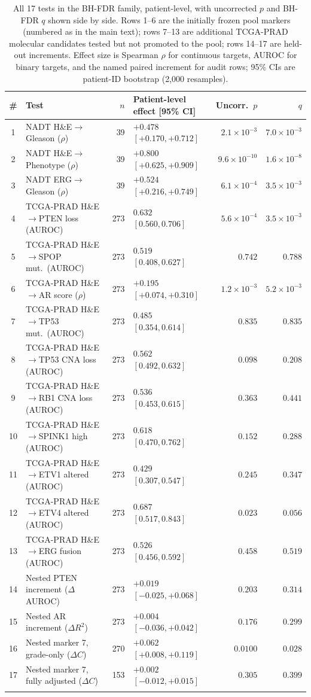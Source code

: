 \begingroup
\footnotesize
\begin{longtable}{@{}clrp{3.6cm}rr@{}}
\toprule
\# & Test & $n$ & Patient-level effect [95\% CI] & Uncorr.\ $p$ & $q$ \\
\midrule
\endhead
1 & NADT H\&E$\to$Gleason ($\rho$) & 39 & $+0.478$ $[+0.170,+0.712]$ & $2.1\times10^{-3}$ & $7.0\times10^{-3}$ \\
2 & NADT H\&E$\to$Phenotype ($\rho$) & 39 & $+0.800$ $[+0.625,+0.909]$ & $9.6\times10^{-10}$ & $1.6\times10^{-8}$ \\
3 & NADT ERG$\to$Gleason ($\rho$) & 39 & $+0.524$ $[+0.216,+0.749]$ & $6.1\times10^{-4}$ & $3.5\times10^{-3}$ \\
4 & TCGA-PRAD H\&E$\to$PTEN loss (AUROC) & 273 & $0.632$ $[0.560,0.706]$ & $5.6\times10^{-4}$ & $3.5\times10^{-3}$ \\
5 & TCGA-PRAD H\&E$\to$SPOP mut.\ (AUROC) & 273 & $0.519$ $[0.408,0.627]$ & $0.742$ & $0.788$ \\
6 & TCGA-PRAD H\&E$\to$AR score ($\rho$) & 273 & $+0.195$ $[+0.074,+0.310]$ & $1.2\times10^{-3}$ & $5.2\times10^{-3}$ \\
7 & TCGA-PRAD H\&E$\to$TP53 mut.\ (AUROC) & 273 & $0.485$ $[0.354,0.614]$ & $0.835$ & $0.835$ \\
8 & TCGA-PRAD H\&E$\to$TP53 CNA loss (AUROC) & 273 & $0.562$ $[0.492,0.632]$ & $0.098$ & $0.208$ \\
9 & TCGA-PRAD H\&E$\to$RB1 CNA loss (AUROC) & 273 & $0.536$ $[0.453,0.615]$ & $0.363$ & $0.441$ \\
10 & TCGA-PRAD H\&E$\to$SPINK1 high (AUROC) & 273 & $0.618$ $[0.470,0.762]$ & $0.152$ & $0.288$ \\
11 & TCGA-PRAD H\&E$\to$ETV1 altered (AUROC) & 273 & $0.429$ $[0.307,0.547]$ & $0.245$ & $0.347$ \\
12 & TCGA-PRAD H\&E$\to$ETV4 altered (AUROC) & 273 & $0.687$ $[0.517,0.843]$ & $0.023$ & $0.056$ \\
13 & TCGA-PRAD H\&E$\to$ERG fusion (AUROC) & 273 & $0.526$ $[0.456,0.592]$ & $0.458$ & $0.519$ \\
14 & Nested PTEN increment ($\Delta$AUROC) & 273 & $+0.019$ $[-0.025,+0.068]$ & $0.203$ & $0.314$ \\
15 & Nested AR increment ($\Delta R^2$) & 273 & $+0.004$ $[-0.036,+0.042]$ & $0.176$ & $0.299$ \\
16 & Nested marker 7, grade-only ($\Delta C$) & 270 & $+0.062$ $[+0.008,+0.119]$ & $0.0100$ & $0.028$ \\
17 & Nested marker 7, fully adjusted ($\Delta C$) & 153 & $+0.002$ $[-0.012,+0.015]$ & $0.305$ & $0.399$ \\
\bottomrule
\caption{All 17 tests in the BH-FDR family, patient-level, with uncorrected $p$ and
BH-FDR $q$ shown side by side. Rows 1--6 are the initially frozen pool markers (numbered as in
the main text); rows 7--13 are additional TCGA-PRAD molecular candidates tested but not
promoted to the pool; rows 14--17 are held-out increments. Effect size is Spearman $\rho$ for
continuous targets, AUROC for binary targets, and the named paired increment for audit rows;
95\% CIs are patient-ID bootstrap (2{,}000 resamples).}
\label{tab:supp-bhfdr}
\end{longtable}
\endgroup

